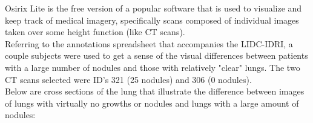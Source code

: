 \documentclass[12pt]{report}
\begin{document}
Osirix Lite is the free version of a popular software that is used to visualize and keep track of medical imagery, specifically scans composed of individual images taken over some height function (like CT scans).\newline
\\
Referring to the annotations spreadsheet that accompanies the LIDC-IDRI, a couple subjects were used to get a sense of the visual differences between patients with a large number of nodules and those with relatively "clear" lungs. The two CT scans selected were ID's 321 (25 nodules) and 306 (0 nodules).\newline
\\
Below are cross sections of the lung that illustrate the difference between images of lungs with virtually no growths or nodules and lungs with a large amount of nodules:\newline
\\
\end{document}
